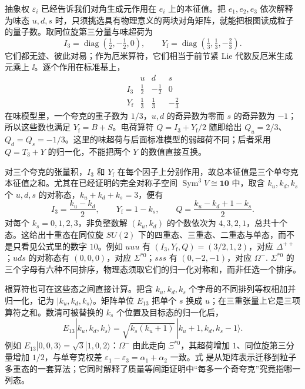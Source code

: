 抽象权 $\varepsilon_i$ 已经告诉我们对角生成元作用在 $e_i$ 上的本征值。把 $e_1,e_2,e_3$ 依次解释为味态 $u,d,s$ 时，只须挑选具有物理意义的两块对角矩阵，就能把根图读成粒子的量子数。取同位旋第三分量与味超荷为
\[
I_3=\operatorname{diag}\!\left(\tfrac12,-\tfrac12,0\right),
\qquad
Y_{\mathrm f}=\operatorname{diag}\!\left(\tfrac13,\tfrac13,-\tfrac23\right).
\]
它们都无迹、彼此对易；作为厄米算符，它们相当于前节紧 Lie 代数反厄米生成元乘上 $\ii$。逐个作用在标准基上，
\[
\begin{array}{c|ccc}
 &u&d&s\\ \hline
I_3&\tfrac12&-\tfrac12&0\\
Y_{\mathrm f}&\tfrac13&\tfrac13&-\tfrac23
\end{array}
\]
在味模型里，一个夸克的重子数为 $1/3$，$u,d$ 的奇异数为零而 $s$ 的奇异数为 $-1$；所以这些数也满足 $Y_{\mathrm f}=B+S$。电荷算符 $Q=I_3+Y_{\mathrm f}/2$ 随即给出 $Q_u=2/3$、$Q_d=Q_s=-1/3$。这里的味超荷与后面标准模型的弱超荷不同；后者采用 $Q=T_3+Y$ 的归一化，不能把两个 $Y$ 的数值直接互换。

对三个夸克的张量积，$I_3$ 和 $Y_{\mathrm f}$ 在每个因子上分别作用，故总本征值是三个单夸克本征值之和。尤其在已经证明的完全对称子空间 $\operatorname{Sym}^3V\cong\mathbf{10}$ 中，取含 $k_u,k_d,k_s$ 个 $u,d,s$ 的对称态，$k_u+k_d+k_s=3$，便有
\begin{equation}
I_3=\frac{k_u-k_d}{2},\qquad
Y_{\mathrm f}=1-k_s,\qquad
Q=\frac{k_u-k_d+1-k_s}{2}.
\label{eq:decuplet-weight-count}
\end{equation}
对每个 $k_s=0,1,2,3$，非负整数解 $(k_u,k_d)$ 的个数依次为 $4,3,2,1$，总共十个态。这给出十重态在同位旋 $SU(2)$ 下的四重态、三重态、二重态与单态，而不是只看见公式里的数字 $10$。例如 $uuu$ 有 $(I_3,Y_{\mathrm f},Q)=(3/2,1,2)$，对应 $\Delta^{++}$；$uds$ 的对称态有 $(0,0,0)$，对应 $\Sigma^{*0}$；$sss$ 有 $(0,-2,-1)$，对应 $\Omega^-$. $\Sigma^{*0}$ 的三个字母有六种不同排序，物理态须取它们的归一化对称和，而非任选一个排序。

根算符也可在这些态之间直接计算。把含 $k_u,k_d,k_s$ 个字母的不同排列等权相加并归一化，记为 $|k_u,k_d,k_s\rangle$。矩阵单位 $E_{13}$ 把单个 $s$ 换成 $u$；在三重张量上它是三项算符之和。数清可被替换的 $k_s$ 个位置及目标态的归一化后，
\begin{equation}
E_{13}|k_u,k_d,k_s\rangle
=\sqrt{k_s(k_u+1)}\,
|k_u+1,k_d,k_s-1\rangle.
\label{eq:decuplet-raising-action}
\end{equation}
例如 $E_{13}|0,0,3\rangle=\sqrt3|1,0,2\rangle$：$\Omega^-$ 由此走向 $\Xi^{*0}$，其超荷增加 $1$、同位旋第三分量增加 $1/2$，与单夸克权差 $\varepsilon_1-\varepsilon_3=\alpha_1+\alpha_2$ 一致。式 是从矩阵表示迁移到粒子多重态的一套算法；它同时解释了质量等间距证明中“每多一个奇夸克”究竟指哪一列态。


